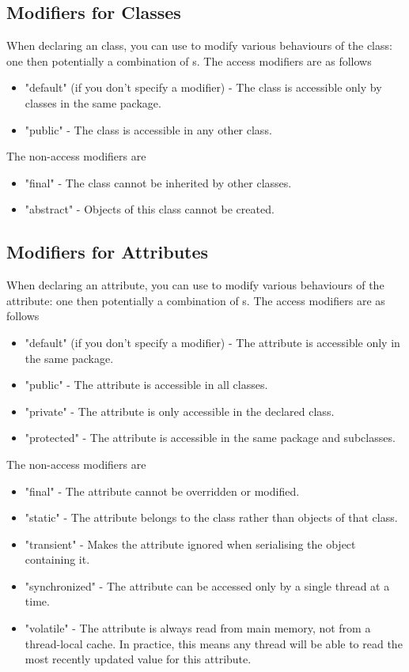 \documentclass[11pt]{article}
\begin{document}
\subsection{Modifiers for Classes}
When declaring an class, you can use  to modify various behaviours of the class: one  then potentially a combination of s. The access modifiers are as follows
\begin{itemize}
    \item \inlineJava"default" (if you don't specify a modifier) - The class is accessible only by classes in the same package.
    \item \inlineJava"public" - The class is accessible in any other class.
\end{itemize}
The non-access modifiers are
\begin{itemize}
    \item \inlineJava"final" - The class cannot be inherited by other classes.
    \item \inlineJava"abstract" - Objects of this class cannot be created.
\end{itemize}


\subsection{Modifiers for Attributes}
When declaring an attribute, you can use  to modify various behaviours of the attribute: one  then potentially a combination of s. The access modifiers are as follows
\begin{itemize}
    \item \inlineJava"default" (if you don't specify a modifier) - The attribute is accessible only in the same package.
    \item \inlineJava"public" - The attribute is accessible in all classes.
    \item \inlineJava"private" - The attribute is only accessible in the declared class.
    \item \inlineJava"protected" - The attribute is accessible in the same package and subclasses.
\end{itemize}
The non-access modifiers are
\begin{itemize}
    \item \inlineJava"final" - The attribute cannot be overridden or modified.
    \item \inlineJava"static" - The attribute belongs to the class rather than objects of that class.
    \item \inlineJava"transient" - Makes the attribute ignored when serialising the object containing it.
    \item \inlineJava"synchronized" - The attribute can be accessed only by a single thread at a time.
    \item \inlineJava"volatile" - The attribute is always read from main memory, not from a thread-local cache. In practice, this means any thread will be able to read the most recently updated value for this attribute.
\end{itemize}
\end{document}
